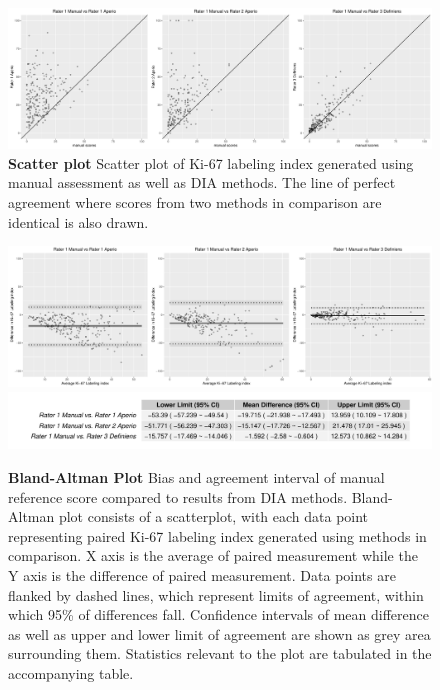 \documentclass[final,5p,times,twocolumn]{elsarticle}
\begin{document}
\begin{figure}
\centering
\includegraphics[width = \linewidth]{scatterplot}

\centering
\caption{{\bf Scatter plot}
Scatter plot of Ki-67 labeling index generated using manual assessment as well as DIA methods. The line of perfect agreement where scores from two methods in comparison are identical is also drawn.
}
\label{scatterplot}
\end{figure}


\begin{figure}
\includegraphics[width = \linewidth]{baplot}
\includegraphics[width = \linewidth]{baStat}

\centering
\caption{{\bf Bland-Altman Plot}
Bias and agreement interval of manual reference score compared to results from DIA methods. Bland-Altman plot consists of a scatterplot, with each data point representing paired Ki-67 labeling index generated using methods in comparison. X axis is the average of paired measurement while the Y axis is the difference of paired measurement. Data points are flanked by dashed lines, which represent limits of agreement, within which 95\% of differences fall. Confidence intervals of mean difference as well as upper and lower limit of agreement are shown as grey area surrounding them. Statistics relevant to the plot are tabulated in the accompanying table.
}
\label{baplot}
\end{figure}
\end{document}
